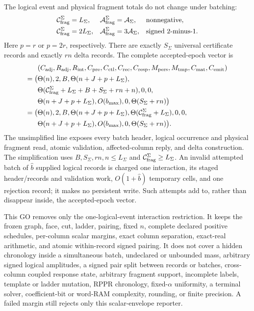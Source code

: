 \begin{theorem}
The logical event and physical fragment totals do not change under batching:
\begin{align}
 \mathcal C_{\rm frag}^{\Sigma}
 &=L_\Sigma,
 &
 \mathcal A_{\rm frag}^{\Sigma}
 &=\mathcal A_\Sigma,
 &&\text{nonnegative},
 \notag\\
 \mathcal C_{\rm frag}^{\Sigma}
 &=2L_\Sigma,
 &
 \mathcal A_{\rm frag}^{\Sigma}
 &=3\mathcal A_\Sigma,
 &&\text{signed $2$-minus-$1$}.
 \label{eq:notched-sun-batch-fragments}
\end{align}
Here $p=r$ or $p=2r$, respectively.  There are exactly $S_\Sigma$
universal certificate records and exactly $rn$ delta records.  The complete
accepted-epoch vector is
\begin{equation}
 \begin{aligned}
 &(C_{\rm adj},R_{\rm adj},R_{\rm int},C_{\rm pre},C_{\rm ctl},C_{\rm rec},
 C_{\rm resp},M_{\rm pers},M_{\rm tmp},C_{\rm mat},C_{\rm emit})\\
 =\bigl(&\Theta(n),2,B,\Theta(n+J+p+L_\Sigma),\\
 &\Theta(\mathcal C_{\rm frag}^{\Sigma}+L_\Sigma+B+S_\Sigma+rn+n),0,0,\\
 &\Theta(n+J+p+L_\Sigma),O(b_{\max}),0,
 \Theta(S_\Sigma+rn)\bigr)\\
 =\bigl(&\Theta(n),2,B,\Theta(n+J+p+L_\Sigma),
 \Theta(\mathcal C_{\rm frag}^{\Sigma}+L_\Sigma),0,0,\\
 &\Theta(n+J+p+L_\Sigma),O(b_{\max}),0,
 \Theta(S_\Sigma+rn)\bigr).
 \end{aligned}
 \label{eq:notched-sun-batch-eleven-vector}
\end{equation}
The unsimplified line exposes every batch header, logical occurrence and
physical fragment read, atomic validation, affected-column reply, and delta
construction.  The simplification uses
$B,S_\Sigma,rn,n\leq L_\Sigma$ and
$\mathcal C_{\rm frag}^{\Sigma}\geq L_\Sigma$.  An invalid attempted batch of
$\widehat b$ supplied logical records is charged one interaction, its staged
header/records and validation work, $O(1+\widehat b)$ temporary cells, and one
rejection record; it makes no persistent write.  Such attempts add to, rather
than disappear inside, the accepted-epoch vector.

This GO removes only the one-logical-event interaction restriction.  It keeps
the frozen graph, face, cut, ladder, pairing, fixed $n$, complete declared
positive schedules, per-column scalar margins, exact column separation,
exact-real arithmetic, and atomic within-record signed pairing.  It does not
cover a hidden chronology inside a simultaneous batch, undeclared or
unbounded mass, arbitrary signed logical amplitudes, a signed pair split
between records or batches, cross-column coupled response state, arbitrary
fragment support, incomplete labels, template or ladder mutation, RPPR
chronology, fixed-$\alpha$ uniformity, a terminal solver, coefficient-bit or
word-RAM complexity, rounding, or finite precision.  A failed margin still
rejects only this scalar-envelope reporter.
\end{theorem}

